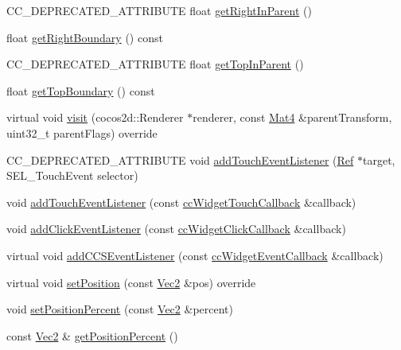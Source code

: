 \begin{DoxyCompactItemize}
\item 
C\+C\+\_\+\+D\+E\+P\+R\+E\+C\+A\+T\+E\+D\+\_\+\+A\+T\+T\+R\+I\+B\+U\+TE float \hyperlink{classui_1_1Widget_ad64a744c35c0ee24d1239c02dad5c03c}{get\+Right\+In\+Parent} ()
\item 
float \hyperlink{classui_1_1Widget_aadc5ba521f815795f2648ee356f26d91}{get\+Right\+Boundary} () const
\item 
C\+C\+\_\+\+D\+E\+P\+R\+E\+C\+A\+T\+E\+D\+\_\+\+A\+T\+T\+R\+I\+B\+U\+TE float \hyperlink{classui_1_1Widget_a3a4efd935d1f5e58f1ee1d56dd493607}{get\+Top\+In\+Parent} ()
\item 
float \hyperlink{classui_1_1Widget_a5b155e9c81f0e4fb9c55e4e37e335aa9}{get\+Top\+Boundary} () const
\item 
virtual void \hyperlink{classui_1_1Widget_a83e4156c39e276986f277e6f7659c319}{visit} (cocos2d\+::\+Renderer $\ast$renderer, const \hyperlink{classMat4}{Mat4} \&parent\+Transform, uint32\+\_\+t parent\+Flags) override
\item 
C\+C\+\_\+\+D\+E\+P\+R\+E\+C\+A\+T\+E\+D\+\_\+\+A\+T\+T\+R\+I\+B\+U\+TE void \hyperlink{classui_1_1Widget_a1a05fc5ea29331d0ae77df9885fc5846}{add\+Touch\+Event\+Listener} (\hyperlink{classRef}{Ref} $\ast$target, S\+E\+L\+\_\+\+Touch\+Event selector)
\item 
void \hyperlink{classui_1_1Widget_a13169efe07b00813c563f56a5753acfe}{add\+Touch\+Event\+Listener} (const \hyperlink{classui_1_1Widget_a4f2987649ba5a33d1edb8b13279b03c9}{cc\+Widget\+Touch\+Callback} \&callback)
\item 
void \hyperlink{classui_1_1Widget_a840938728aeeca3152490620ab1952d1}{add\+Click\+Event\+Listener} (const \hyperlink{classui_1_1Widget_a01110bd071334e41c48ee0bec593db61}{cc\+Widget\+Click\+Callback} \&callback)
\item 
virtual void \hyperlink{classui_1_1Widget_acf4c0f85e9c868801632bed8dae9dae1}{add\+C\+C\+S\+Event\+Listener} (const \hyperlink{classui_1_1Widget_a15b83a56c3c29442ec103100b45e56c7}{cc\+Widget\+Event\+Callback} \&callback)
\item 
virtual void \hyperlink{classui_1_1Widget_ad1983665a8a2463e77c9ff7e13fcac97}{set\+Position} (const \hyperlink{classVec2}{Vec2} \&pos) override
\item 
void \hyperlink{classui_1_1Widget_a6950cd713842c572b7934e41d1244e12}{set\+Position\+Percent} (const \hyperlink{classVec2}{Vec2} \&percent)
\item 
const \hyperlink{classVec2}{Vec2} \& \hyperlink{classui_1_1Widget_a188dee36b0882a5f7790363cd0f1dea0}{get\+Position\+Percent} ()

\end{DoxyCompactItemize}
